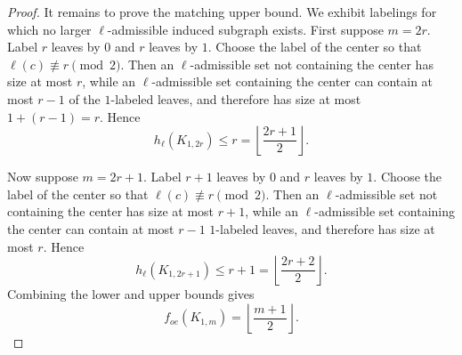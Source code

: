 \documentclass[10pt,a4paper]{amsart}
\begin{document}
\begin{proof}
It remains to prove the matching upper bound. We exhibit labelings for which no larger
\(\ell\)-admissible induced subgraph exists.
First suppose \(m=2r\). Label \(r\) leaves by \(0\) and \(r\) leaves by
\(1\). Choose the label of the center so that
\(
\ell(c)\not\equiv r\pmod 2.
\)
Then an \(\ell\)-admissible set not containing the center has size at most \(r\), while
an \(\ell\)-admissible set containing the center can contain at most \(r-1\) of the
\(1\)-labeled leaves, and therefore has size at most \(1+(r-1)=r\). Hence
\[
h_\ell(K_{1,2r})\le r=\left\lfloor\frac{2r+1}{2}\right\rfloor .
\]

Now suppose \(m=2r+1\). Label \(r+1\) leaves by \(0\) and \(r\) leaves
by \(1\). Choose the label of the center so that
$
\ell(c)\not\equiv r\pmod 2.
$
Then an \(\ell\)-admissible set not containing the center has size at most \(r+1\),
while an \(\ell\)-admissible set containing the center can contain at most \(r-1\)
\(1\)-labeled leaves, and therefore has size at most \(r\). Hence
\[
h_\ell(K_{1,2r+1})\le r+1
=
\left\lfloor\frac{2r+2}{2}\right\rfloor .
\]
Combining the lower and upper bounds gives
\[
f_{oe}(K_{1,m})=\left\lfloor \frac{m+1}{2}\right\rfloor .
\]
\end{proof}
\end{document}

